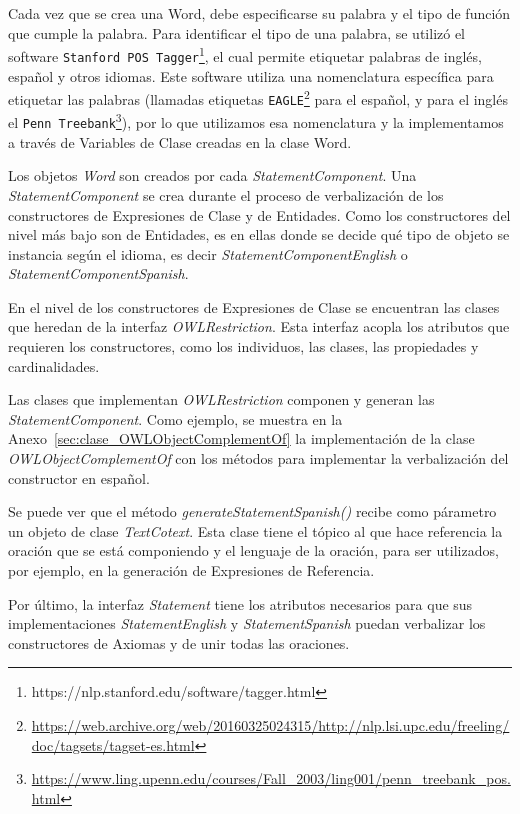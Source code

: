 Cada vez que se crea una Word, debe especificarse su palabra y el tipo de función que cumple la palabra. Para identificar el tipo de una palabra, se utilizó el software \texttt{Stanford POS Tagger}\footnote{https://nlp.stanford.edu/software/tagger.html}, el cual permite etiquetar palabras de inglés, español y otros idiomas. Este software utiliza una nomenclatura específica para etiquetar las palabras (llamadas etiquetas \texttt{EAGLE}\footnote{\url{https://web.archive.org/web/20160325024315/http://nlp.lsi.upc.edu/freeling/doc/tagsets/tagset-es.html}} para el español, y para el inglés el \texttt{Penn Treebank}\footnote{\url{https://www.ling.upenn.edu/courses/Fall_2003/ling001/penn_treebank_pos.html}}), por lo que utilizamos esa nomenclatura y la implementamos a través de Variables de Clase creadas en la clase Word.

Los objetos \emph{Word} son creados por cada \emph{StatementComponent}. Una \emph{StatementComponent} se crea durante el proceso de verbalización de los constructores de Expresiones de Clase y de Entidades. Como los constructores del nivel más bajo son de Entidades, es en ellas donde se decide qué tipo de objeto se instancia según el idioma, es decir \emph{StatementComponentEnglish} o \emph{StatementComponentSpanish}. 

En el nivel de los constructores de Expresiones de Clase se encuentran las clases que heredan de la interfaz \emph{OWLRestriction}. Esta interfaz acopla los atributos que requieren los constructores, como los individuos, las clases, las propiedades y cardinalidades.

Las clases que implementan \emph{OWLRestriction} componen y generan las \emph{StatementComponent}. Como ejemplo, se muestra en la Anexo~\ref{sec:clase_OWLObjectComplementOf} la implementación de la clase \emph{OWLObjectComplementOf} con los métodos para implementar la verbalización del constructor en español.

Se puede ver que el método \emph{generateStatementSpanish()} recibe como párametro un objeto de clase \emph{TextCotext}. Esta clase tiene el tópico al que hace referencia la oración que se está componiendo y el lenguaje de la oración, para ser utilizados, por ejemplo, en la generación de Expresiones de Referencia.

Por último, la interfaz \emph{Statement} tiene los atributos necesarios para que sus implementaciones \emph{StatementEnglish} y \emph{StatementSpanish} puedan verbalizar los constructores de Axiomas y de unir todas las oraciones. 

